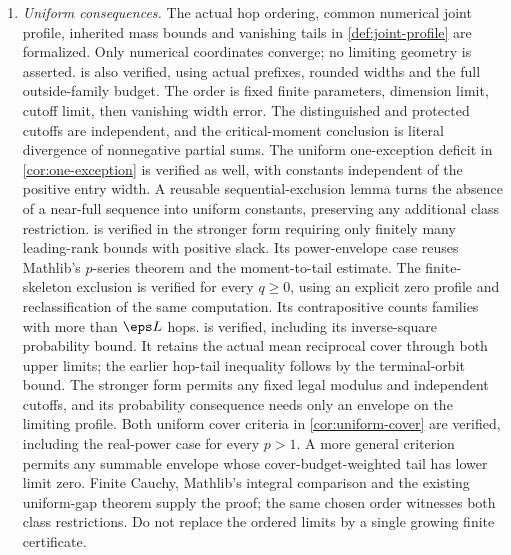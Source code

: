 \begin{enumerate}
\item \emph{Uniform consequences.}
The actual hop ordering, common numerical joint profile, inherited mass
bounds and vanishing tails in \cref{def:joint-profile} are formalized.
Only numerical coordinates converge; no limiting geometry is asserted.
 is also verified, using actual prefixes,
rounded widths and the full outside-family budget. The order is fixed
finite parameters, dimension limit, cutoff limit, then vanishing width
error. The distinguished and protected cutoffs are independent, and the
critical-moment conclusion is literal divergence of nonnegative partial
sums. The uniform one-exception deficit in \cref{cor:one-exception}
is verified as well, with constants independent of the positive entry
width. A reusable sequential-exclusion lemma turns the absence of a
near-full sequence into uniform constants, preserving any additional
class restriction.  is verified in the stronger
form requiring only finitely many leading-rank bounds with positive slack.
Its power-envelope case reuses Mathlib's $p$-series theorem and the
moment-to-tail estimate. The finite-skeleton exclusion is verified for
every $q\ge0$, using an explicit zero profile and reclassification of the
same computation. Its contrapositive counts families with more than
$\eps L$ hops.  is verified, including its
inverse-square probability bound. It retains the actual mean reciprocal
cover through both upper limits; the earlier hop-tail inequality follows
by the terminal-orbit bound. The stronger form permits any fixed legal
modulus and independent cutoffs, and its probability consequence needs
only an envelope on the limiting profile. Both uniform cover criteria in
\cref{cor:uniform-cover} are verified, including the real-power case
for every $p>1$. A more general criterion permits any summable envelope
whose cover-budget-weighted tail has lower limit zero. Finite Cauchy,
Mathlib's integral comparison and the existing uniform-gap theorem supply
the proof; the same chosen order witnesses both class restrictions.
Do not replace the ordered limits by a single growing finite certificate.


\end{enumerate}
